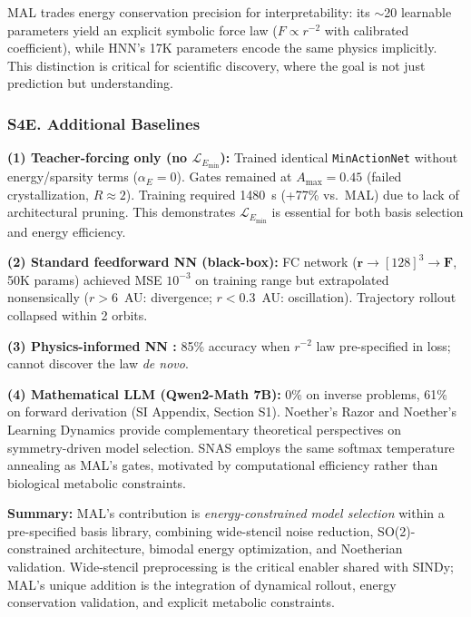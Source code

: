 \documentclass[9pt,twocolumn,twoside]{pnas-new}
\begin{document}
MAL trades energy conservation precision for interpretability: its $\sim$20 learnable parameters yield an explicit symbolic force law ($F \propto r^{-2}$ with calibrated coefficient), while HNN's 17K parameters encode the same physics implicitly. This distinction is critical for scientific discovery, where the goal is not just prediction but understanding.

\subsubsection*{S4E. Additional Baselines}

\textbf{(1) Teacher-forcing only (no $\mathcal{L}_{E_{\min}}$):}
Trained identical \texttt{MinActionNet} without energy/sparsity terms ($\alpha_E = 0$). Gates remained at $A_{\max} = 0.45$ (failed crystallization, $R \approx 2$). Training required 1480~s (+77\% vs.\ MAL) due to lack of architectural pruning. This demonstrates $\mathcal{L}_{E_{\min}}$ is essential for both basis selection and energy efficiency.

\textbf{(2) Standard feedforward NN (black-box):}
FC network ($\mathbf{r} \to [128]^3 \to \mathbf{F}$, 50K params) achieved MSE $10^{-3}$ on training range but extrapolated nonsensically ($r > 6$~AU: divergence; $r < 0.3$~AU: oscillation). Trajectory rollout collapsed within 2 orbits.

\textbf{(3) Physics-informed NN \cite{Raissi2019}:}
85\% accuracy when $r^{-2}$ law pre-specified in loss; cannot discover the law \textit{de novo}.

\textbf{(4) Mathematical LLM (Qwen2-Math 7B):}
0\% on inverse problems, 61\% on forward derivation (SI Appendix, Section S1). Noether's Razor \cite{vanderOuderaa2024} and Noether's Learning Dynamics \cite{Tanaka2021} provide complementary theoretical perspectives on symmetry-driven model selection. SNAS \cite{Xie2019SNAS} employs the same softmax temperature annealing as MAL's gates, motivated by computational efficiency rather than biological metabolic constraints.

\textbf{Summary:} MAL's contribution is \textit{energy-constrained model selection} within a pre-specified basis library, combining wide-stencil noise reduction, SO(2)-constrained architecture, bimodal energy optimization, and Noetherian validation. Wide-stencil preprocessing is the critical enabler shared with SINDy; MAL's unique addition is the integration of dynamical rollout, energy conservation validation, and explicit metabolic constraints.
\end{document}
